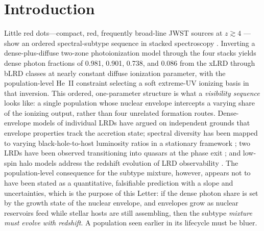 \documentclass[twocolumn]{aastex631}
\begin{document}
\section{Introduction}\label{sec:intro}
Little red dots---compact, red, frequently broad-line JWST sources at
$z\gtrsim4$ \citep{Matthee2024,Greene2024,Kocevski2025}---show
an ordered spectral-subtype sequence in stacked spectroscopy
\citep{PerezGonzalez2026}. Inverting a dense-plus-diffuse two-zone
photoionization model through the four stacks yields dense photon
fractions of 0.981, 0.901, 0.738, and 0.086 from the xLRD through bLRD
classes at nearly constant diffuse ionization parameter, with the
population-level He~II constraint \citep{Sok2026} selecting a soft
extreme-UV ionizing basis in that inversion. This ordered, one-parameter
structure is what a \emph{visibility sequence} looks like: a single
population whose nuclear envelope intercepts a varying share of the
ionizing output, rather than four unrelated formation routes.
Dense-envelope models of individual LRDs
\citep[e.g.,][]{Naidu2025,deGraaff2025} have argued on independent
grounds that envelope properties track the accretion state; spectral
diversity has been mapped to varying black-hole-to-host luminosity ratios
in a stationary framework \citep{Barro2025}; two LRDs have been observed
transitioning into quasars at the phase exit \citep{Fu2025}; and
low-spin halo models address the redshift evolution of LRD observability
\citep{PacucciLoeb2025}. The population-level consequence for the subtype
mixture, however, appears not to have been stated as a quantitative,
falsifiable prediction with a slope and uncertainties, which is the
purpose of this Letter: if the dense photon share is set by
the growth state of the nuclear envelope, and envelopes grow as nuclear
reservoirs feed while stellar hosts are still assembling, then the
subtype \emph{mixture must evolve with redshift}. A population seen
earlier in its lifecycle must be bluer.
\end{document}
